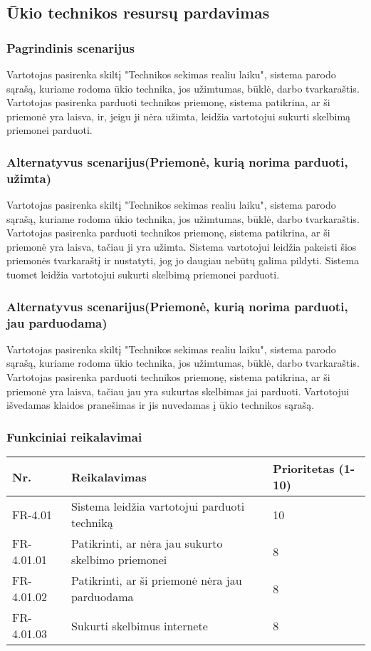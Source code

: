 \documentclass[oneside]{VUMIFPSkursinis}
\begin{document}
\subsection{Ūkio technikos resursų pardavimas}
\subsubsection{Pagrindinis scenarijus}
	Vartotojas pasirenka skiltį "Technikos sekimas realiu laiku", sistema parodo sąrašą, kuriame rodoma ūkio technika, jos užimtumas, būklė, darbo tvarkaraštis. Vartotojas pasirenka parduoti technikos priemonę, sistema patikrina, ar ši priemonė yra laisva, ir, jeigu ji nėra užimta, leidžia vartotojui sukurti skelbimą priemonei parduoti.
\subsubsection{Alternatyvus scenarijus(Priemonė, kurią norima parduoti, užimta)}
	Vartotojas pasirenka skiltį "Technikos sekimas realiu laiku", sistema parodo sąrašą, kuriame rodoma ūkio technika, jos užimtumas, būklė, darbo tvarkaraštis. Vartotojas pasirenka parduoti technikos priemonę, sistema patikrina, ar ši priemonė yra laisva, tačiau ji yra užimta. Sistema vartotojui leidžia pakeisti šios priemonės tvarkaraštį ir nustatyti, jog jo daugiau nebūtų galima pildyti. Sistema tuomet leidžia vartotojui sukurti skelbimą priemonei parduoti.
\subsubsection{Alternatyvus scenarijus(Priemonė, kurią norima parduoti, jau parduodama)}
	Vartotojas pasirenka skiltį "Technikos sekimas realiu laiku", sistema parodo sąrašą, kuriame rodoma ūkio technika, jos užimtumas, būklė, darbo tvarkaraštis. Vartotojas pasirenka parduoti technikos priemonę, sistema patikrina, ar ši priemonė yra laisva, tačiau jau yra sukurtas skelbimas jai parduoti. Vartotojui išvedamas klaidos pranešimas ir jis nuvedamas į ūkio technikos sąrašą.
\subsubsection{Funkciniai reikalavimai}
\begin{table}[htbp]
	\begin{tabularx}{1\textwidth}{ |P{2.5cm}|X|P{3cm }| }  \hline
    Nr. & Reikalavimas &  Prioritetas (1-10)  \\   \hline 
    FR-4.01 & Sistema leidžia vartotojui parduoti techniką & 10  \\   \hline
		FR-4.01.01 & Patikrinti, ar nėra jau sukurto skelbimo priemonei & 8 \\  \hline
		FR-4.01.02 & Patikrinti, ar ši priemonė nėra jau parduodama & 8 \\ \hline
		FR-4.01.03 & Sukurti skelbimus internete & 8 \\ \hline
	\end{tabularx}
\end{table}
\end{document}
